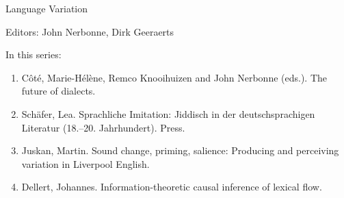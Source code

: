{\large Language Variation}

\bigskip

Editors: John Nerbonne, Dirk Geeraerts

\bigskip

In this series:

\begin{enumerate}
\item Côté, Marie-Hélène, Remco Knooihuizen and John Nerbonne (eds.).  The future of dialects.
\item Schäfer, Lea. Sprachliche Imitation: Jiddisch in der deutschsprachigen Literatur (18.–20. Jahrhundert).
Press.
\item Juskan, Martin. Sound change, priming, salience: Producing and perceiving variation in Liverpool English.
\item Dellert, Johannes. Information-theoretic causal inference of lexical flow.
\end{enumerate}
 
